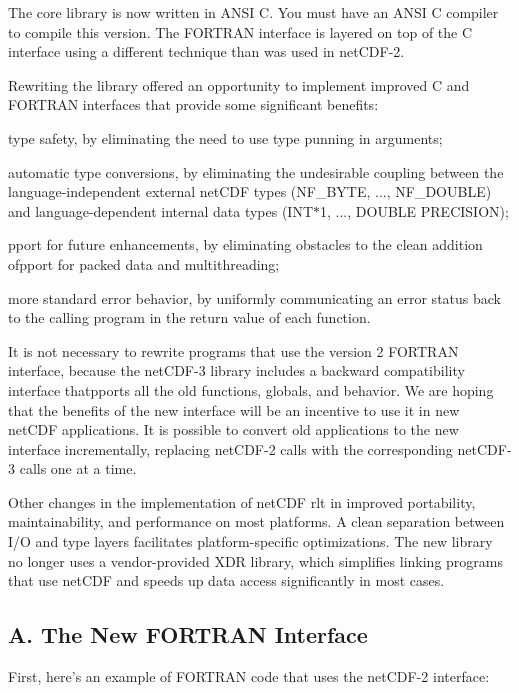 The core library is now written in A\+N\+SI C. You must have an A\+N\+SI C compiler to compile this version. The F\+O\+R\+T\+R\+AN interface is layered on top of the C interface using a different technique than was used in net\+C\+D\+F-\/2.

Rewriting the library offered an opportunity to implement improved C and F\+O\+R\+T\+R\+AN interfaces that provide some significant benefits\+:


\begin{DoxyItemize}
\item type safety, by eliminating the need to use type punning in arguments;
\item automatic type conversions, by eliminating the undesirable coupling between the language-\/independent external net\+C\+DF types (N\+F\+\_\+\+B\+Y\+TE, ..., N\+F\+\_\+\+D\+O\+U\+B\+LE) and language-\/dependent internal data types (I\+N\+T$\ast$1, ..., D\+O\+U\+B\+LE P\+R\+E\+C\+I\+S\+I\+ON);
\item pport for future enhancements, by eliminating obstacles to the clean addition ofpport for packed data and multithreading;
\item more standard error behavior, by uniformly communicating an error status back to the calling program in the return value of each function.
\end{DoxyItemize}

It is not necessary to rewrite programs that use the version 2 F\+O\+R\+T\+R\+AN interface, because the net\+C\+D\+F-\/3 library includes a backward compatibility interface thatpports all the old functions, globals, and behavior. We are hoping that the benefits of the new interface will be an incentive to use it in new net\+C\+DF applications. It is possible to convert old applications to the new interface incrementally, replacing net\+C\+D\+F-\/2 calls with the corresponding net\+C\+D\+F-\/3 calls one at a time.

Other changes in the implementation of net\+C\+DF rlt in improved portability, maintainability, and performance on most platforms. A clean separation between I/O and type layers facilitates platform-\/specific optimizations. The new library no longer uses a vendor-\/provided X\+DR library, which simplifies linking programs that use net\+C\+DF and speeds up data access significantly in most cases.\hypertarget{nc_f77_interface_guide_f77_new_fortran_interface}{}\subsection{A. The New F\+O\+R\+T\+R\+A\+N Interface }\label{nc_f77_interface_guide_f77_new_fortran_interface}
First, here’s an example of F\+O\+R\+T\+R\+AN code that uses the net\+C\+D\+F-\/2 interface\+:


